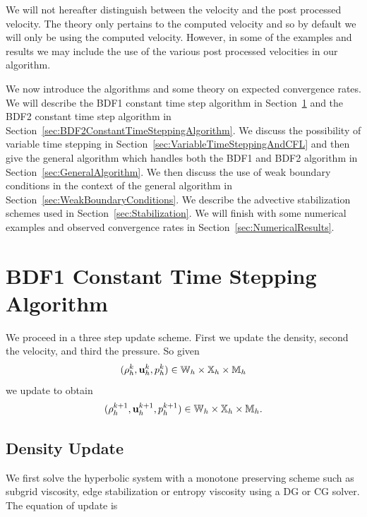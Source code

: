 \documentclass[letterpaper]{erdc}
\begin{document}
\begin{remark}
  We will not hereafter distinguish between the velocity and the post processed
  velocity.  The theory only pertains to the computed velocity and so by
  default we will only be using the computed velocity.  However, in some of the
  examples and results we may include the use of the various post processed
  velocities in our algorithm.
\end{remark}

We now introduce the algorithms and some theory on expected convergence rates.
We will describe the BDF1 constant time step algorithm in
Section~\ref{sec:BDF1ConstantTimeSteppingAlgorithm} and the BDF2 constant time
step algorithm in Section~\ref{sec:BDF2ConstantTimeSteppingAlgorithm}. We
discuss the possibility of variable time stepping in
Section~\ref{sec:VariableTimeSteppingAndCFL} and then give the general
algorithm which handles both the BDF1 and BDF2 algorithm in
Section~\ref{sec:GeneralAlgorithm}.  We then discuss the use of weak boundary
conditions in the context of the general algorithm in
Section~\ref{sec:WeakBoundaryConditions}.  We describe the advective
stabilization schemes used in Section~\ref{sec:Stabilization}.  We will finish
with some numerical examples and observed convergence rates in
Section~\ref{sec:NumericalResults}.


%
%
%
\section{BDF1 Constant Time Stepping Algorithm}
\label{sec:BDF1ConstantTimeSteppingAlgorithm}

We proceed in a three step update scheme.  First we update the density, second
the velocity, and third the pressure.  So given
\begin{equation}(\rho^{k}_h, \textbf{u}^{k}_{h}, p^{k}_h) \in \mathbb{W}_h\times\mathbb{X}_h\times \mathbb{M}_h  \end{equation}
we update to obtain
\begin{equation}(\rho^{k+1}_h, \textbf{u}^{k+1}_{h}, p^{k+1}_h) \in \mathbb{W}_h\times\mathbb{X}_h\times \mathbb{M}_h.\end{equation}

%
%
\subsection{Density Update}

We first solve the hyperbolic system with a monotone preserving scheme such as
subgrid viscosity, edge stabilization or entropy viscosity using a DG or CG
solver.  The equation of update is
\end{document}
